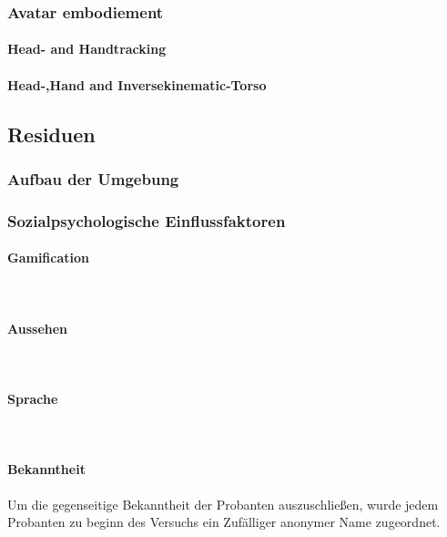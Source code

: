 \documentclass[a4paper,11pt]{article}%
\renewcommand{\\}{\vspace*{0.5\baselineskip} \newline}
\begin{document}
{			\subsubsection{Avatar embodiement}
				\paragraph{Head- and Handtracking}
				\paragraph{Head-,Hand and Inversekinematic-Torso}
		\subsection{Residuen}
			\subsubsection{Aufbau der Umgebung}
			\subsubsection{Sozialpsychologische Einflussfaktoren}
				\paragraph{Gamification} $~$ \\
				\paragraph{Aussehen} $~$ \\
				\paragraph{Sprache} $~$ \\	
				\paragraph{Bekanntheit}
				Um die gegenseitige Bekanntheit der Probanten auszuschließen, wurde jedem Probanten zu beginn des Versuchs ein Zufälliger anonymer Name zugeordnet.
}
\end{document}
